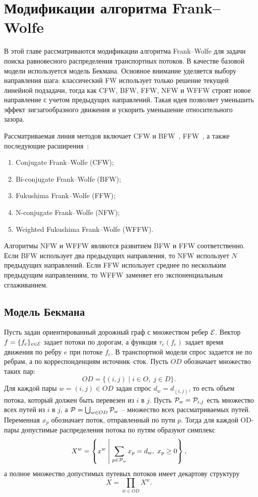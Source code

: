\newpage

\section{Модификации алгоритма Frank--Wolfe}
\label{sec:fw-modifications}

В этой главе рассматриваются модификации алгоритма Frank--Wolfe для задачи поиска равновесного распределения транспортных потоков.
В качестве базовой модели используется модель Бекмана.
Основное внимание уделяется выбору направления шага: классический FW использует только решение текущей линейной подзадачи, тогда как CFW, BFW, FFW, NFW и WFFW строят новое направление с учетом предыдущих направлений.
Такая идея позволяет уменьшить эффект зигзагообразного движения и ускорить уменьшение относительного зазора.

Рассматриваемая линия методов включает CFW и BFW~\cite{mitradjieva2013stiff}, FFW~\cite{fukushima1984modified}, а также последующие расширения~\cite{ignashin2024modifications}:
\begin{enumerate}
    \item Conjugate Frank--Wolfe (CFW);
    \item Bi-conjugate Frank--Wolfe (BFW);
    \item Fukushima Frank--Wolfe (FFW);
    \item N-conjugate Frank--Wolfe (NFW);
    \item Weighted Fukushima Frank--Wolfe (WFFW).
\end{enumerate}
Алгоритмы NFW и WFFW являются развитием BFW и FFW соответственно.
Если BFW использует два предыдущих направления, то NFW использует $N$ предыдущих направлений.
Если FFW использует среднее по нескольким предыдущим направлениям, то WFFW заменяет его экспоненциальным сглаживанием.

\subsection{Модель Бекмана}

Пусть задан ориентированный дорожный граф с множеством ребер $\mathcal{E}$.
Вектор $f=\{f_e\}_{e\in\mathcal{E}}$ задает потоки по дорогам, а функция $\tau_e(f_e)$ задает
время движения по ребру $e$ при потоке $f_e$.
В транспортной модели спрос задается не по ребрам, а по корреспонденциям источник--сток.
Пусть $OD$ обозначает множество таких пар:
\[
    OD=\{(i,j)\mid i\in O,\;j\in D\}.
\]
Для каждой пары $w=(i,j)\in OD$ задан спрос $d_w=d_{(i,j)}$, то есть объем потока,
который должен быть перевезен из $i$ в $j$.
Пусть $\mathcal{P}_w=\mathcal{P}_{i,j}$ есть множество всех путей из $i$ в $j$, а
$\mathcal{P}=\bigcup_{w\in OD}\mathcal{P}_w$ -- множество всех рассматриваемых путей.
Переменная $x_p$ обозначает поток, отправленный по пути $p$.
Тогда для каждой OD-пары допустимые распределения потока по путям образуют симплекс
\[
    X^w=
    \left\{
        x^w \;\middle|\;
        \sum_{p\in\mathcal{P}_w}x_p=d_w,\;
        x_p\geq 0
    \right\},
\]
а полное множество допустимых путевых потоков имеет декартову структуру
\[
    X=\prod_{w\in OD}X^w.
\]


